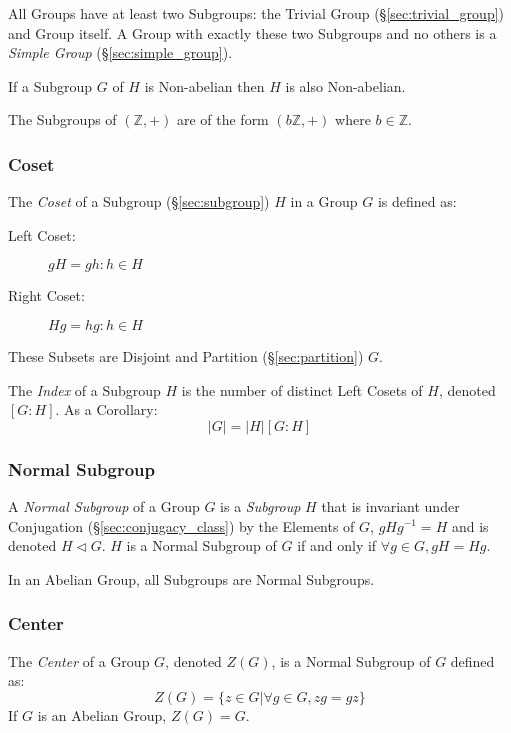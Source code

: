 All Groups have at least two Subgroups: the Trivial Group
(\S\ref{sec:trivial_group}) and Group itself. A Group with exactly
these two Subgroups and no others is a \emph{Simple Group}
(\S\ref{sec:simple_group}).

If a Subgroup $G$ of $H$ is Non-abelian then $H$ is also Non-abelian.

The Subgroups of $(\mathbb{Z},+)$ are of the form $(b\mathbb{Z},+)$
where $b \in \mathbb{Z}$.



\subsubsection{Coset}\label{sec:coset}

The \emph{Coset} of a Subgroup (\S\ref{sec:subgroup}) $H$ in a Group
$G$ is defined as:
\begin{description}
\item[Left Coset:] $gH = {gh : h \in H}$
\item[Right Coset:] $Hg = {hg : h \in H}$
\end{description}
These Subsets are Disjoint and Partition (\S\ref{sec:partition}) $G$.

The \emph{Index} of a Subgroup $H$ is the number of distinct Left
Cosets of $H$, denoted $[G:H]$. As a Corollary:
\[
    |G| = |H|[G:H]
\]



\subsubsection{Normal Subgroup}\label{sec:normal_subgroup}

A \emph{Normal Subgroup} of a Group $G$ is a \emph{Subgroup} $H$ that
is invariant under Conjugation (\S\ref{sec:conjugacy_class}) by the
Elements of $G$, $gHg^{-1} = H$ and is denoted $H \triangleleft G$.
$H$ is a Normal Subgroup of $G$ if and only if $\forall g \in G, gH =
Hg$.

In an Abelian Group, all Subgroups are Normal Subgroups.



\subsubsection{Center}\label{sec:group_center}

The \emph{Center} of a Group $G$, denoted $Z(G)$, is a Normal Subgroup
of $G$ defined as:
\[
    Z(G) = \{ z \in G | \forall g \in G, zg = gz \}
\]
If $G$ is an Abelian Group, $Z(G) = G$.

